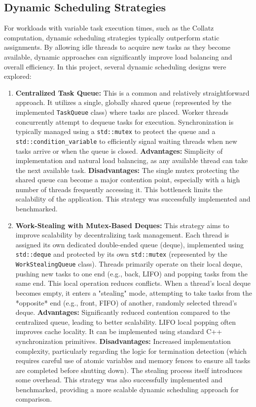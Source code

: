 \documentclass[10pt]{article}
\newcommand{\code}[1]{\texttt{#1}} %
\begin{document}
\subsection{Dynamic Scheduling Strategies}
For workloads with variable task execution times, such as the Collatz computation, dynamic scheduling strategies typically outperform static assignments. By allowing idle threads to acquire new tasks as they become available, dynamic approaches can significantly improve load balancing and overall efficiency. In this project, several dynamic scheduling designs were explored:

\begin{enumerate}
    \item \textbf{Centralized Task Queue:} This is a common and relatively straightforward approach. It utilizes a single, globally shared queue (represented by the implemented \code{TaskQueue} class) where tasks are placed. Worker threads concurrently attempt to dequeue tasks for execution. Synchronization is typically managed using a \code{std::mutex} to protect the queue and a \code{std::condition\_variable} to efficiently signal waiting threads when new tasks arrive or when the queue is closed.
          \textbf{Advantages:} Simplicity of implementation and natural load balancing, as any available thread can take the next available task.
          \textbf{Disadvantages:} The single mutex protecting the shared queue can become a major contention point, especially with a high number of threads frequently accessing it. This bottleneck limits the scalability of the application. This strategy was successfully implemented and benchmarked.

    \item \textbf{Work-Stealing with Mutex-Based Deques:} This strategy aims to improve scalability by decentralizing task management. Each thread is assigned its own dedicated double-ended queue (deque), implemented using \code{std::deque} and protected by its own \code{std::mutex} (represented by the \code{WorkStealingQueue} class). Threads primarily operate on their local deque, pushing new tasks to one end (e.g., back, LIFO) and popping tasks from the same end. This local operation reduces conflicts. When a thread's local deque becomes empty, it enters a "stealing" mode, attempting to take tasks from the *opposite* end (e.g., front, FIFO) of another, randomly selected thread's deque.
          \textbf{Advantages:} Significantly reduced contention compared to the centralized queue, leading to better scalability. LIFO local popping often improves cache locality. It can be implemented using standard C++ synchronization primitives.
          \textbf{Disadvantages:} Increased implementation complexity, particularly regarding the logic for termination detection (which requires careful use of atomic variables and memory fences to ensure all tasks are completed before shutting down). The stealing process itself introduces some overhead. This strategy was also successfully implemented and benchmarked, providing a more scalable dynamic scheduling approach for comparison.


\end{enumerate}
\end{document}
